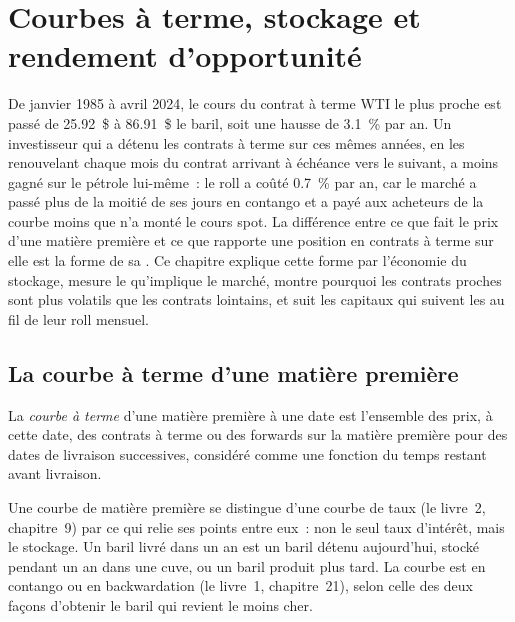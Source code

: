 \chapter{Courbes à terme, stockage et rendement d'opportunité}\label{ch:m3:forward-curves-storage-and-convenience-yield}

De janvier 1985 à avril 2024, le cours du contrat à terme WTI le plus proche est passé de 25.92~\$ à 86.91~\$ le
baril, soit une hausse de 3.1~\% par an. Un investisseur qui a détenu les contrats à terme sur ces mêmes années, en les renouvelant
chaque mois du contrat arrivant à échéance vers le suivant, a moins gagné sur le pétrole lui-même~: le roll
a coûté 0.7~\% par an, car le marché a passé plus de la moitié de ses jours en contango et a payé
aux acheteurs de la courbe moins que n'a monté le cours spot. La différence entre ce que fait le
prix d'une matière première et ce que rapporte une position en contrats à terme sur elle est la forme de sa . Ce
chapitre explique cette forme par l'économie du stockage, mesure le 
qu'implique le marché, montre pourquoi les contrats proches sont plus volatils que les contrats lointains, et suit
les capitaux qui suivent les  au fil de leur roll mensuel.

\section{La courbe à terme d'une matière première}

\begin{definition}\label{def:m3:forward-curves-storage-and-convenience-yield:curve}
La \emph{courbe à terme} d'une matière première à une date est l'ensemble des prix,
à cette date, des contrats à terme ou des forwards sur la matière première pour des dates de livraison successives, considéré
comme une fonction du temps restant avant livraison.
\end{definition}

Une courbe de matière première se distingue d'une courbe de taux (le livre~2, chapitre~9) par ce qui relie ses points
entre eux~: non le seul taux d'intérêt, mais le stockage. Un baril livré dans un an est un baril détenu aujourd'hui, stocké pendant un
an dans une cuve, ou un baril produit plus tard. La courbe est en contango ou en backwardation (le livre~1,
chapitre~21), selon celle des deux façons d'obtenir le baril qui revient le moins cher.

